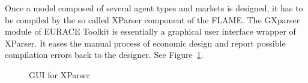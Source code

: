 Once a model composed of several agent types and markets is designed, it has to be compiled by the so called XParser component of the FLAME.  The GXparser module of EURACE Toolkit is essentially a graphical user interface wrapper of XParser. It eases the manual process of economic design and report possible compilation errors back to the designer. See Figure~\ref{figure:gxparser}.
\begin{figure}[h]
  \centering
{}
  \caption{GUI for XParser}
  \label{figure:gxparser}
\end{figure}
